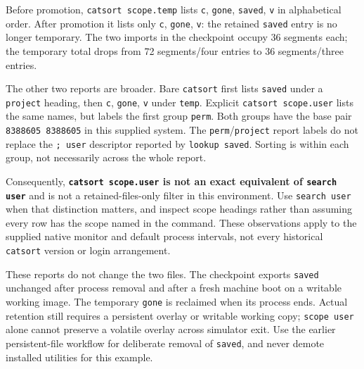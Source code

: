 Before promotion, \passthrough{\lstinline!catsort scope.temp!} lists \passthrough{\lstinline!c!}, \passthrough{\lstinline!gone!}, \passthrough{\lstinline!saved!}, \passthrough{\lstinline!v!} in alphabetical order. After promotion it lists only \passthrough{\lstinline!c!}, \passthrough{\lstinline!gone!}, \passthrough{\lstinline!v!}: the retained \passthrough{\lstinline!saved!} entry is no longer temporary. The two imports in the checkpoint occupy 36 segments each; the temporary total drops from 72 segments/four entries to 36 segments/three entries.

The other two reports are broader. Bare \passthrough{\lstinline!catsort!} first lists \passthrough{\lstinline!saved!} under a \passthrough{\lstinline!project!} heading, then \passthrough{\lstinline!c!}, \passthrough{\lstinline!gone!}, \passthrough{\lstinline!v!} under \passthrough{\lstinline!temp!}. Explicit \passthrough{\lstinline!catsort scope.user!} lists the same names, but labels the first group \passthrough{\lstinline!perm!}. Both groups have the base pair \passthrough{\lstinline!8388605 8388605!} in this supplied system. The \passthrough{\lstinline!perm!}/\passthrough{\lstinline!project!} report labels do not replace the \passthrough{\lstinline!; user!} descriptor reported by \passthrough{\lstinline!lookup saved!}. Sorting is within each group, not necessarily across the whole report.

Consequently, \textbf{\passthrough{\lstinline!catsort scope.user!} is not an exact equivalent of \passthrough{\lstinline!search user!}} and is not a retained-files-only filter in this environment. Use \passthrough{\lstinline!search user!} when that distinction matters, and inspect scope headings rather than assuming every row has the scope named in the command. These observations apply to the supplied native monitor and default process intervals, not every historical \passthrough{\lstinline!catsort!} version or login arrangement.

These reports do not change the two files. The checkpoint exports \passthrough{\lstinline!saved!} unchanged after process removal and after a fresh machine boot on a writable working image. The temporary \passthrough{\lstinline!gone!} is reclaimed when its process ends. Actual retention still requires a persistent overlay or writable working copy; \passthrough{\lstinline!scope user!} alone cannot preserve a volatile overlay across simulator exit. Use the earlier persistent-file workflow for deliberate removal of \passthrough{\lstinline!saved!}, and never demote installed utilities for this example.

